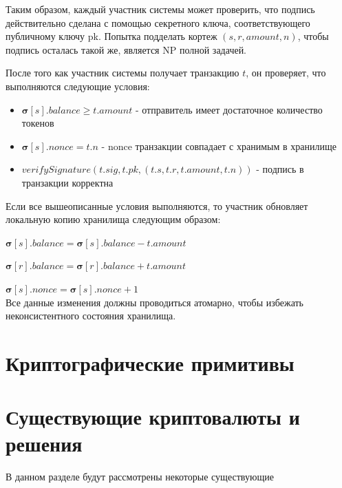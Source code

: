 \noindent Таким образом, каждый участник системы может проверить, что подпись действительно сделана с помощью секретного ключа, соответствующего публичному ключу pk. Попытка подделать кортеж $(s, r, amount, n)$, чтобы подпись осталась такой же, является NP полной задачей.

После того как участник системы получает транзакцию $t$, он проверяет, что выполняются следующие условия:
\begin{itemize}
\item $\boldsymbol{\sigma}[s].balance \ge t.amount$ - отправитель имеет достаточное количество токенов
\item $\boldsymbol{\sigma}[s].nonce = t.n$ - nonce транзакции совпадает с хранимым в хранилище
\item $verifySignature(t.sig, t.pk, (t.s, t.r, t.amount, t.n))$ - подпись в транзакции корректна
\end{itemize}

Если все вышеописанные условия выполняются, то участник обновляет локальную копию хранилища следующим образом:

$\boldsymbol{\sigma}[s].balance = \boldsymbol{\sigma}[s].balance - t.amount$

$\boldsymbol{\sigma}[r].balance = \boldsymbol{\sigma}[r].balance + t.amount$

$\boldsymbol{\sigma}[s].nonce = \boldsymbol{\sigma}[s].nonce + 1$\\
Все данные изменения должны проводиться атомарно, чтобы избежать неконсистентного состояния хранилища.


\section{Криптографические примитивы}

\section{Существующие криптовалюты и решения}
В данном разделе будут рассмотрены некоторые существующие

